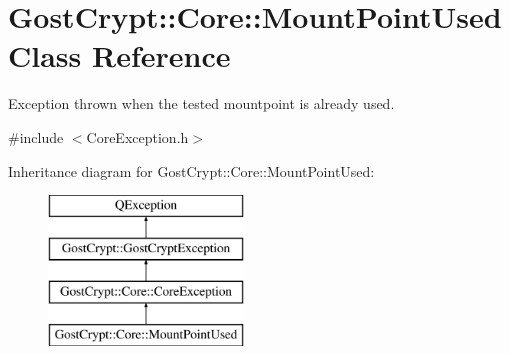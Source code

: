 \hypertarget{class_gost_crypt_1_1_core_1_1_mount_point_used}{}\section{Gost\+Crypt\+:\+:Core\+:\+:Mount\+Point\+Used Class Reference}
\label{class_gost_crypt_1_1_core_1_1_mount_point_used}


Exception thrown when the tested mountpoint is already used.  




{\ttfamily \#include $<$Core\+Exception.\+h$>$}

Inheritance diagram for Gost\+Crypt\+:\+:Core\+:\+:Mount\+Point\+Used\+:\begin{figure}[H]
\begin{center}
\leavevmode
\includegraphics[height=4.000000cm]{class_gost_crypt_1_1_core_1_1_mount_point_used}
\end{center}
\end{figure}
